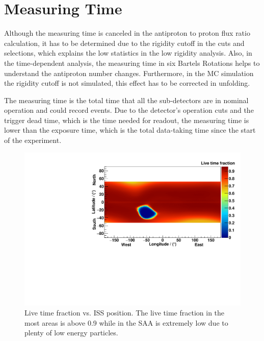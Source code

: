 
\section{Measuring Time} \label{MeasuringTimeSection}

Although the measuring time is canceled in the antiproton to proton flux ratio calculation, it has to be determined due to the rigidity cutoff in the cuts and selections, which explains the low statistics in the low rigidity analysis. Also, in the time-dependent analysis, the measuring time in six Bartels Rotations helps to understand the antiproton number changes. Furthermore, in the MC simulation the rigidity cutoff is not simulated, this effect has to be corrected in unfolding. \par 

The measuring time is the total time that all the sub-detectors are in nominal operation and could record events. Due to the detector's operation cuts and the trigger dead time, which is the time needed for readout, the measuring time is lower than the exposure time, which is the total data-taking time since the start of the experiment.   \par



\begin{figure}[htpb]
\centering
\includegraphics[width=1.0\textwidth]{Figures/chapter4/MeasuringTime/LiveTimeFractionVsISSPosition.pdf}
\caption[Live time fraction vs. ISS position.]{Live time fraction vs. ISS position. The live time fraction in the most areas is above 0.9 while in the SAA is extremely low due to plenty of low energy particles.}
\label{LiveTimeFractionVsISSPosition}
\end{figure}

